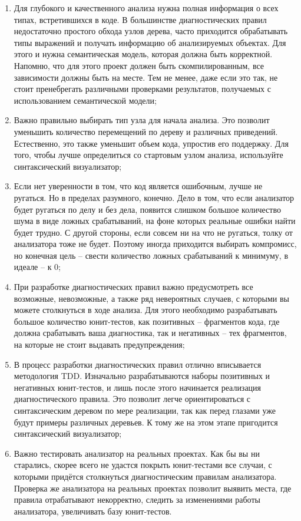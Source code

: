 \documentclass{article}
\begin{document}
\begin{enumerate} 
  \item Для глубокого и качественного анализа нужна полная информация о всех типах, встретившихся в коде. В большинстве диагностических правил недостаточно простого обхода узлов дерева, часто приходится обрабатывать типы выражений и получать информацию об анализируемых объектах. Для этого и нужна семантическая модель, которая должна быть корректной. Напомню, что для этого проект должен быть скомпилированным, все зависимости должны быть на месте. Тем не менее, даже если это так, не стоит пренебрегать различными проверками результатов, получаемых с использованием семантической модели;
  \item  Важно правильно выбирать тип узла для начала анализа. Это позволит уменьшить количество перемещений по дереву и различных приведений. Естественно, это также уменьшит объем кода, упростив его поддержку. Для того, чтобы лучше определиться со стартовым узлом анализа, используйте синтаксический визуализатор;
  \item  Если нет уверенности в том, что код является ошибочным, лучше не ругаться. Но в пределах разумного, конечно. Дело в том, что если анализатор будет ругаться по делу и без дела, появится слишком большое количество шума в виде ложных срабатываний, на фоне которых реальные ошибки найти будет трудно. С другой стороны, если совсем ни на что не ругаться, толку от анализатора тоже не будет. Поэтому иногда приходится выбирать компромисс, но конечная цель – свести количество ложных срабатываний к минимуму, в идеале – к 0;
  \item  При разработке диагностических правил важно предусмотреть все возможные, невозможные, а также ряд невероятных случаев, с которыми вы можете столкнуться в ходе анализа. Для этого необходимо разрабатывать большое количество юнит-тестов, как позитивных – фрагментов кода, где должна срабатывать ваша диагностика, так и негативных – тех фрагментов, на которые не стоит выдавать предупреждения;
  \item  В процесс разработки диагностических правил отлично вписывается методология TDD. Изначально разрабатываются наборы позитивных и негативных юнит-тестов, и лишь после этого начинается реализация диагностического правила. Это позволит легче ориентироваться с синтаксическим деревом по мере реализации, так как перед глазами уже будут примеры различных деревьев. К тому же на этом этапе пригодится синтаксический визуализатор;
  \item  Важно тестировать анализатор на реальных проектах. Как бы вы ни старались, скорее всего не удастся покрыть юнит-тестами все случаи, с которыми придётся столкнуться диагностическим правилам анализатора. Проверка же анализатора на реальных проектах позволит выявить места, где правила отрабатывают некорректно, следить за изменениями работы анализатора, увеличивать базу юнит-тестов.
\end{enumerate}
\end{document}
